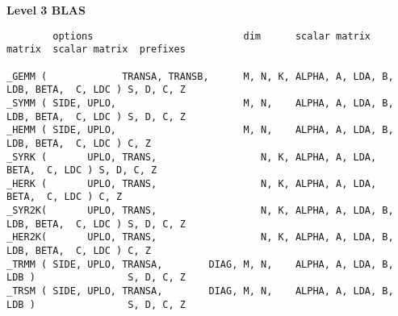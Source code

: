 {\bf Level 3 BLAS}
\begin{verbatim}
        options                          dim      scalar matrix  matrix  scalar matrix  prefixes

_GEMM (             TRANSA, TRANSB,      M, N, K, ALPHA, A, LDA, B, LDB, BETA,  C, LDC ) S, D, C, Z
_SYMM ( SIDE, UPLO,                      M, N,    ALPHA, A, LDA, B, LDB, BETA,  C, LDC ) S, D, C, Z
_HEMM ( SIDE, UPLO,                      M, N,    ALPHA, A, LDA, B, LDB, BETA,  C, LDC ) C, Z
_SYRK (       UPLO, TRANS,                  N, K, ALPHA, A, LDA,         BETA,  C, LDC ) S, D, C, Z
_HERK (       UPLO, TRANS,                  N, K, ALPHA, A, LDA,         BETA,  C, LDC ) C, Z
_SYR2K(       UPLO, TRANS,                  N, K, ALPHA, A, LDA, B, LDB, BETA,  C, LDC ) S, D, C, Z
_HER2K(       UPLO, TRANS,                  N, K, ALPHA, A, LDA, B, LDB, BETA,  C, LDC ) C, Z
_TRMM ( SIDE, UPLO, TRANSA,        DIAG, M, N,    ALPHA, A, LDA, B, LDB )                S, D, C, Z
_TRSM ( SIDE, UPLO, TRANSA,        DIAG, M, N,    ALPHA, A, LDA, B, LDB )                S, D, C, Z
\end{verbatim}


